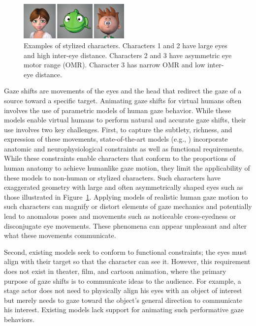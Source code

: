 \begin{figure}[b]
\centering
\vspace{-6pt}
\includegraphics[width=0.48\textwidth]{Figures/StylizedCharacterExamples-small.pdf}
\caption{Examples of stylized characters. Characters 1 and 2 have large eyes and high inter-eye distance. Characters 2 and 3 have asymmetric eye motor range (OMR). Character 3 has narrow OMR and low inter-eye distance.}
\vspace{-6pt}
\label{fig:StylizedCharacterExamples}
\end{figure}

Gaze shifts are movements of the eyes and the head that redirect the gaze of a source toward a specific target. Animating gaze shifts for virtual humans often involves the use of parametric models of human gaze behavior. While these models enable virtual humans to perform natural and accurate gaze shifts, their use involves two key challenges. First, to capture the subtlety, richness, and expression of these movements, state-of-the-art models (e.g., \cite{andrist2012headeye,lance2010expressive}) incorporate anatomic and neurophysiological constraints as well as functional requirements. While these constraints enable characters that conform to the proportions of human anatomy to achieve humanlike gaze motion, they limit the applicability of these models to non-human or stylized characters. Such characters have exaggerated geometry with large and often asymmetrically shaped eyes such as those illustrated in Figure~\ref{fig:StylizedCharacterExamples}. Applying models of realistic human gaze motion to such characters can magnify or distort elements of gaze mechanics and potentially lead to anomalous poses and movements such as noticeable cross-eyedness or disconjugate eye movements. These phenomena can appear unpleasant and alter what these movements communicate.

Second, existing models seek to conform to functional constraints; the eyes must align with their target so that the character can see it. However, this requirement does not exist in theater, film, and cartoon animation, where the primary purpose of gaze shifts is to communicate ideas to the audience. For example, a stage actor does not need to physically align his eyes with an object of interest but merely needs to gaze toward the object's general direction to communicate his interest. Existing models lack support for animating such performative gaze behaviors.

